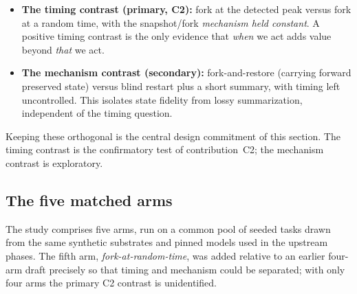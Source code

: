 \begin{itemize}
  \item \textbf{The timing contrast (primary, C2):} fork at the detected peak
        versus fork at a random time, with the snapshot/fork \emph{mechanism
        held constant}. A positive timing contrast is the only evidence that
        \emph{when} we act adds value beyond \emph{that} we act.
  \item \textbf{The mechanism contrast (secondary):} fork-and-restore (carrying
        forward preserved state) versus blind restart plus a short summary,
        with timing left uncontrolled. This isolates state fidelity from
        lossy summarization, independent of the timing question.
\end{itemize}

Keeping these orthogonal is the central design commitment of this section. The
timing contrast is the confirmatory test of contribution~C2; the mechanism
contrast is exploratory.

\subsection{The five matched arms}
\label{sec:intervention:arms}

The study comprises five arms, run on a common pool of seeded tasks drawn from
the same synthetic substrates and pinned models used in the upstream phases. The
fifth arm, \emph{fork-at-random-time}, was added relative to an earlier
four-arm draft precisely so that timing and mechanism could be separated; with
only four arms the primary C2 contrast is unidentified.

